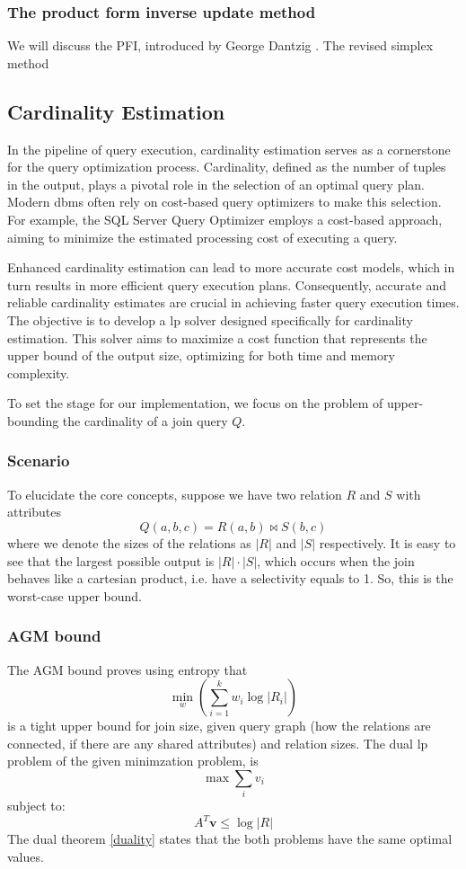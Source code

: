 \subsubsection*{The product form inverse update method}
We will discuss the PFI, introduced by George Dantzig \parencite{dantzig1954product}.
The revised simplex method 
\subsection{Cardinality Estimation}\label{subsection:cardinality-estimate}
In the pipeline of query execution, cardinality estimation serves
as a cornerstone for the query optimization process.
Cardinality, defined as the number of tuples in the output,
plays a pivotal role in the selection of an optimal query plan.
Modern \gls{dbms} often rely on
cost-based query optimizers to make this selection.
For example, the SQL Server Query Optimizer
\parencite{microsoft2023cardinality} employs a
cost-based approach, aiming to minimize the estimated
processing cost of executing a query.

Enhanced cardinality estimation
can lead to more accurate cost models, which in turn results
in more efficient query execution plans.
Consequently, accurate and reliable cardinality estimates are
crucial in achieving faster query execution times.
The objective is to develop a \gls{lp}
solver designed specifically for cardinality estimation.
This solver aims to maximize a cost function that represents
the upper bound of the output size, optimizing for both
time and memory complexity.

To set the stage for our implementation,
we focus on the problem of upper-bounding the
cardinality of a join query $Q$.

\subsubsection{Scenario}
To elucidate the core concepts,
suppose we have two relation $R$ and $S$ with attributes 
\[
    Q(a, b, c) = R(a, b) \Join S(b, c)
\]
where we denote the sizes of the relations as
$|R|$ and $|S|$ respectively.
It is easy to see that the largest possible output is $|R| \cdot |S|$, which occurs when the join
behaves like a cartesian product, i.e. have a selectivity equals to 1. So, this is the worst-case
upper bound.
\subsubsection{AGM bound}
The AGM bound \parencite{atserias2013size} proves
using entropy that \[ \min_w \left( \sum_{i=1}^{k} w_i \log |R_i| \right) \]
is a tight upper bound for join size, given query graph (how the
relations are connected, if there are any shared attributes)
and relation sizes.
The dual \gls{lp} problem of the given minimzation problem, is
\[ \max \sum_{i} v_i \]
subject to:
\[ A^T \mathbf{v} \leq \log |R| \]
The dual theorem \ref{duality} states that the both problems have the same 
optimal values. 

